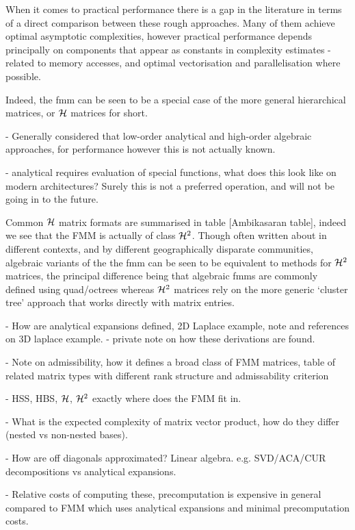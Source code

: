 When it comes to practical performance there is a gap in the literature in terms of a direct comparison between these rough approaches. Many of them achieve optimal asymptotic complexities, however practical performance depends principally on components that appear as constants in complexity estimates - related to memory accesses, and optimal vectorisation and parallelisation where possible.

Indeed, the \acrshort{fmm} can be seen to be a special case of the more general hierarchical matrices, or $\mathcal{H}$ matrices for short.

- Generally considered that low-order analytical and high-order algebraic approaches, for performance however this is not actually known.

- analytical requires evaluation of special functions, what does this look like on modern architectures? Surely this is not a preferred operation, and will not be going in to the future.

Common $\mathcal{H}$ matrix formats are summarised in table [Ambikasaran table], indeed we see that the FMM is actually of class $\mathcal{H}^2$. Though often written about in different contexts, and by different geographically disparate communities, algebraic variants of the the \acrshort{fmm} can be seen to be equivalent to methods for $\mathcal{H}^2$ matrices, the principal difference being that algebraic \glspl{fmm} are commonly defined using quad/octrees whereas $\mathcal{H}^2$ matrices rely on the more generic `cluster tree' approach that works directly with matrix entries.

- How are analytical expansions defined, 2D Laplace example, note and references on 3D laplace example.
    - private note on how these derivations are found.

- Note on admissibility, how it defines a broad class of FMM matrices, table of related matrix types with different rank structure and admissability criterion

- HSS, HBS, $\mathcal{H}$, $\mathcal{H}^2$ exactly where does the FMM fit in.

- What is the expected complexity of matrix vector product, how do they differ (nested vs non-nested bases).

- How are off diagonals approximated? Linear algebra. e.g. SVD/ACA/CUR decompositions vs analytical expansions.

- Relative costs of computing these, precomputation is expensive in general compared to FMM which uses analytical expansions and minimal precomputation costs.

